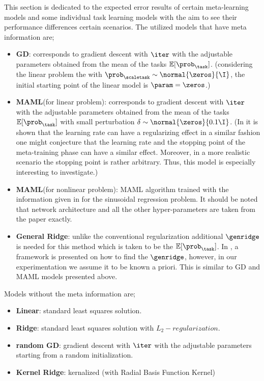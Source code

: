 This section is dedicated to the expected error results of certain meta-learning models and some individual task learning models with the aim to see their performance differences certain scenarios. The utilized models that have meta information are;
\begin{itemize}
  \item \textbf{GD}: corresponds to gradient descent with $\iter$ with the adjustable parameters obtained from the mean of the tasks $\mathbb{E}[\prob_{\task}]$. (\eg considering the linear problem the with $\prob_{\scaletask}\sim\normal{\zeros}{\I}$, the initial starting point of the linear model is $\param=\zeros$.)
  \item \textbf{MAML}(for linear problem): corresponds to gradient descent with $\iter$ with the adjustable parameters obtained from the mean of the tasks $\mathbb{E}[\prob_{\task}]$ with small perturbation $\delta\sim\normal{\zeros}{0.1\I}$. (In \cite{Nakkiran2020b} it is shown that the learning rate can have a regularizing effect in a similar fashion one might conjecture that the learning rate and the stopping point of the meta-training phase can have a similar effect. Moreover, in a more realistic scenario the stopping point is rather arbitrary. Thus, this model is especially interesting to investigate.)
  \item \textbf{MAML}(for nonlinear problem): MAML algorithm trained with the information given in \cite{Finn2017} for the sinusoidal regression problem. It should be noted that network architecture and all the other hyper-parameters are taken from the paper exactly.
  \item \textbf{General Ridge}: unlike the conventional regularization additional $\genridge$ is needed for this method which is taken to be the $\mathbb{E}[\prob_{\task}]$. In \cite{Denevi2018a}, a framework is presented on how to find the $\genridge$, however, in our experimentation we assume it to be known a priori. This is similar to GD and MAML models presented above.
\end{itemize} 
Models without the meta information are;
\begin{itemize}
  \item \textbf{Linear}: standard least squares solution.
  \item \textbf{Ridge}: standard least squares solution with $L_2-regularization$.
  \item \textbf{random GD}: gradient descent with $\iter$ with the adjustable parameters starting from a random initialization.
  \item \textbf{Kernel Ridge}: kernalized (with Radial Basis Function Kernel) 
\end{itemize}

